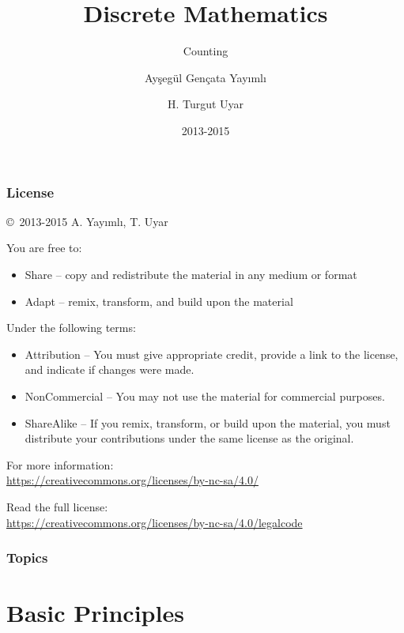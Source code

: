 \documentclass[dvipsnames]{beamer}
\title{Discrete Mathematics}
\subtitle{Counting}
\author{Ayşegül Gençata Yayımlı \and H. Turgut Uyar}
\date{2013-2015}
\begin{document}
\begin{frame}
  \titlepage
\end{frame}

\begin{frame}
  \frametitle{License}

  \hfill
  \copyright~2013-2015 A. Yayımlı, T. Uyar

  \vfill
  \begin{footnotesize}
    You are free to:
    \begin{itemize}
      \itemsep0em
      \item Share -- copy and redistribute the material in any medium or format
      \item Adapt -- remix, transform, and build upon the material
    \end{itemize}

    Under the following terms:
    \begin{itemize}
      \itemsep0em
      \item Attribution -- You must give appropriate credit, provide a link to
        the license, and indicate if changes were made.

      \item NonCommercial -- You may not use the material for commercial
        purposes.

      \item ShareAlike -- If you remix, transform, or build upon the material,
        you must distribute your contributions under the same license as the
        original.
    \end{itemize}
  \end{footnotesize}

  \begin{small}
    For more information:\\
    \url{https://creativecommons.org/licenses/by-nc-sa/4.0/}

    \smallskip
    Read the full license:\\
    \url{https://creativecommons.org/licenses/by-nc-sa/4.0/legalcode}
  \end{small}
\end{frame}

\begin{frame}
  \frametitle{Topics}
  \tableofcontents
\end{frame}

\section{Basic Principles}
\end{document}
